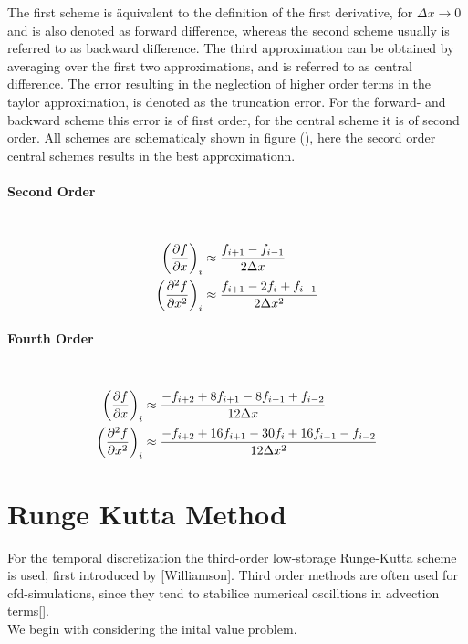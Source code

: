 The first scheme is äquivalent to the definition of the first derivative, for $\Delta x \rightarrow 0$ and is also
denoted as forward difference, whereas the second scheme usually is referred to as backward difference.
The third approximation can be obtained by averaging over the first two approximations, and  is referred to as central difference.
The error resulting in the neglection of higher order terms in the taylor approximation, is denoted as the truncation error.
For the forward- and backward scheme this error is of first order, for the central scheme it is of second order.
All schemes are schematicaly shown in figure (), here the secord order central schemes results in the best approximationn.
\citep{Fornberg1988}


\paragraph{Second Order}\mbox{}\\
\begin{align}
    \left(\pdn[f]{x}\right)_i &\approx \frac{f_{i+1} - f_{i-1}}{2\Delta x} \\
    \left(\pdn[^2f]{x^2}\right)_i &\approx \frac{f_{i+1} - 2 f_i +  f_{i-1}}{2\Delta x^2}
\end{align}
\paragraph{Fourth Order}\mbox{}\\
\begin{align}
    \left(\pdn[f]{x}\right)_i &\approx \frac{-f_{i+2} + 8f_{i+1} - 8f_{i-1} + f_{i-2}}{12\Delta x} \\
    \left(\pdn[^2f]{x^2}\right)_i &\approx \frac{-f_{i+2} + 16f_{i+1} -30f_i + 16f_{i-1} - f_{i-2}}{12\Delta x^2} \\
\end{align}

\newpage

\section{Runge Kutta Method}

For the temporal discretization the third-order low-storage Runge-Kutta scheme is used, first introduced by [Williamson].
Third order methods are often used for cfd-simulations, since they tend to stabilice numerical oscilltions in advection terms[].\\
We begin with considering the inital value problem.

